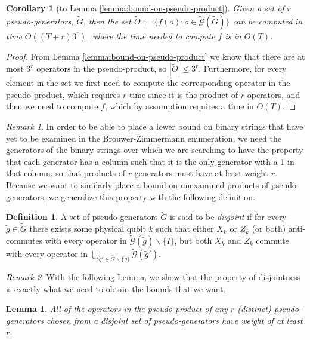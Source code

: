 \documentclass{amsbook}
\theoremstyle{plain}
\newtheorem{lemma}{Lemma}
\newtheorem{corollary}{Corollary}
\theoremstyle{definition}
\newtheorem{definition}{Definition}
\theoremstyle{remark}
\newtheorem{remark}{Remark}
\newcommand{\set}{\tilde}
\newcommand{\genfun}{\tilde{\mathcal{G}}}
\begin{document}
\begin{corollary}[to Lemma \ref{lemma:bound-on-pseudo-product}]
\label{corolary:bound-on-pseudo-product}
Given a set of $r$ pseudo-generators, $\set G$, then the set $\set O:=\{f(o):o\in\genfun(\set G)\}$ can be computed in time $O((T+r) 3^r)$, where the time needed to compute $f$ is in $O(T)$.
\end{corollary}

\begin{proof}
From Lemma \ref{lemma:bound-on-pseudo-product} we know that there are at most $3^r$ operators in the pseudo-product, so $|\set O|\le 3^r$.  Furthermore, for every element in the set we first need to compute the corresponding operator in the pseudo-product, which requires $r$ time since it is the product of $r$ operators, and then we need to compute $f$, which by assumption requires a time in $O(T)$.
\end{proof}
\begin{remark}
In order to be able to place a lower bound on binary strings that have yet to be examined in the Brouwer-Zimmermann enumeration, we need the generators of the binary strings over which we are searching to have the property that each generator has a column such that it is the only generator with a 1 in that column, so that products of $r$ generators must have at least weight $r$.  Because we want to similarly place a bound on unexamined products of pseudo-generators, we generalize this property with the following definition.
\end{remark}

\begin{definition}
\label{definition:disjoint-pseudo-generators}
A set of pseudo-generators $\set G$ is said to be \emph{disjoint} if for every $\set g\in\set G$ there exists some physical qubit $k$ such that either $X_k$ or $Z_k$ (or both) anti-commutes with every operator in $\genfun(\set g)\backslash\{I\}$, but both $X_k$ and $Z_k$ commute with every operator in $\bigcup_{\set g'\in\set G\backslash\{\set g\}}\genfun(\set g')$.
\end{definition}

\begin{remark}
With the following Lemma, we show that the property of disjointness is exactly what we need to obtain the bounds that we want.
\end{remark}

\begin{lemma}
\label{lemma:disjoint-pseudo-generators-bound}
All of the operators in the pseudo-product of any $r$ (distinct) pseudo-generators chosen from a disjoint set of pseudo-generators have weight of at least $r$.
\end{lemma}
\end{document}

